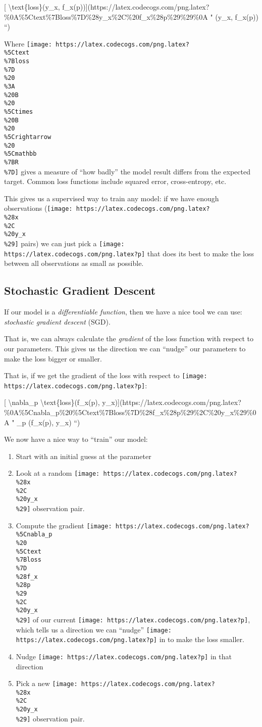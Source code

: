 \documentclass[]{article}
\begin{document}
{[} \textbackslash{}text\{loss\}(y\_x,
f\_x(p)){]}(https://latex.codecogs.com/png.latex?\%0A\%5Ctext\%7Bloss\%7D\%28y\_x\%2C\%20f\_x\%28p\%29\%29\%0A
" (y\_x, f\_x(p)) ``)

Where
\texttt{[image: https://latex.codecogs.com/png.latex?\\\%5Ctext\\\%7Bloss\\\%7D\\\%20\\\%3A\\\%20B\\\%20\\\%5Ctimes\\\%20B\\\%20\\\%5Crightarrow\\\%20\\\%5Cmathbb\\\%7BR\\\%7D]}
gives a measure of ``how badly'' the model result differs from the expected
target. Common loss functions include squared error, cross-entropy, etc.

This gives us a supervised way to train any model: if we have enough
observations
(\texttt{[image: https://latex.codecogs.com/png.latex?\\\%28x\\\%2C\\\%20y\_x\\\%29]}
pairs) we can just pick a
\texttt{[image: https://latex.codecogs.com/png.latex?p]} that does its best to
make the loss between all observations as small as possible.

\hypertarget{stochastic-gradient-descent}{%
\subsection{Stochastic Gradient Descent}\label{stochastic-gradient-descent}}

If our model is a \emph{differentiable function}, then we have a nice tool we
can use: \emph{stochastic gradient descent} (SGD).

That is, we can always calculate the \emph{gradient} of the loss function with
respect to our parameters. This gives us the direction we can ``nudge'' our
parameters to make the loss bigger or smaller.

That is, if we get the gradient of the loss with respect to
\texttt{[image: https://latex.codecogs.com/png.latex?p]}:

{[} \textbackslash{}nabla\_p \textbackslash{}text\{loss\}(f\_x(p),
y\_x){]}(https://latex.codecogs.com/png.latex?\%0A\%5Cnabla\_p\%20\%5Ctext\%7Bloss\%7D\%28f\_x\%28p\%29\%2C\%20y\_x\%29\%0A
" \nabla\_p (f\_x(p), y\_x) ``)

We now have a nice way to ``train'' our model:

\begin{enumerate}
\def\labelenumi{\arabic{enumi}.}
\tightlist
\item
  Start with an initial guess at the parameter
\item
  Look at a random
  \texttt{[image: https://latex.codecogs.com/png.latex?\\\%28x\\\%2C\\\%20y\_x\\\%29]}
  observation pair.
\item
  Compute the gradient
  \texttt{[image: https://latex.codecogs.com/png.latex?\\\%5Cnabla\_p\\\%20\\\%5Ctext\\\%7Bloss\\\%7D\\\%28f\_x\\\%28p\\\%29\\\%2C\\\%20y\_x\\\%29]}
  of our current \texttt{[image: https://latex.codecogs.com/png.latex?p]}, which
  tells us a direction we can ``nudge''
  \texttt{[image: https://latex.codecogs.com/png.latex?p]} in to make the loss
  smaller.
\item
  Nudge \texttt{[image: https://latex.codecogs.com/png.latex?p]} in that
  direction
\item
  Pick a new
  \texttt{[image: https://latex.codecogs.com/png.latex?\\\%28x\\\%2C\\\%20y\_x\\\%29]}
  observation pair.
\end{enumerate}
\end{document}
